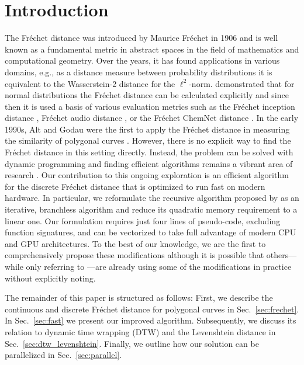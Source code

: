 \section{Introduction}
The Fr\'echet distance was introduced by Maurice Fr\'echet in 1906 \citep{frechet06} and is well known as a fundamental metric in abstract spaces in the field of mathematics and computational geometry.
Over the years, it has found applications in various domains, e.g., as a distance measure between probability distributions it is equivalent to the Wasserstein-2 distance \citep{kantorovich60,wasserstein69} for the $\ell^2$-norm.
\citet{dowson82} demonstrated that for normal distributions the Fr\'echet distance can be calculated explicitly and since then it is used a basis of various evaluation metrics such as the Fr\'echet inception distance \citep{heusel17}, Fr\'echet audio distance \citep{kilgour19}, or the Fr\'echet ChemNet distance \citep{preuer18}.
In the early 1990s, Alt and Godau were the first to apply the Fr\'echet distance in measuring the similarity of polygonal curves \citep{alt92,alt95}.
However, there is no explicit way to find the Fr\'echet distance in this setting directly.
Instead, the problem can be solved with dynamic programming and finding efficient algorithms remains a vibrant area of research \citep{aronov06,avraham14,agarwal14,bringmann19}.
Our contribution to this ongoing exploration is an efficient algorithm for the discrete Fr\'echet distance that is optimized to run fast on modern hardware.
In particular, we reformulate the recursive algorithm proposed by \citet{eiter94} as an iterative, branchless algorithm and reduce its quadratic memory requirement to a linear one.
Our formulation requires just four lines of pseudo-code, excluding function signatures, and can be vectorized to take full advantage of modern CPU and GPU architectures.
To the best of our knowledge, we are the first to comprehensively propose these modifications although it is possible that others---while only referring to \citet{eiter94}---are already using some of the modifications in practice without explicitly noting.

The remainder of this paper is structured as follows:
First, we describe the continuous and discrete Fr\'echet distance for polygonal curves in Sec.~\ref{sec:frechet}.
In Sec.~\ref{sec:fast} we present our improved algorithm.
Subsequently, we discuss its relation to dynamic time wrapping (DTW) and the Levenshtein distance in Sec.~\ref{sec:dtw_levenshtein}.
Finally, we outline how our solution can be parallelized in Sec.~\ref{sec:parallel}.

